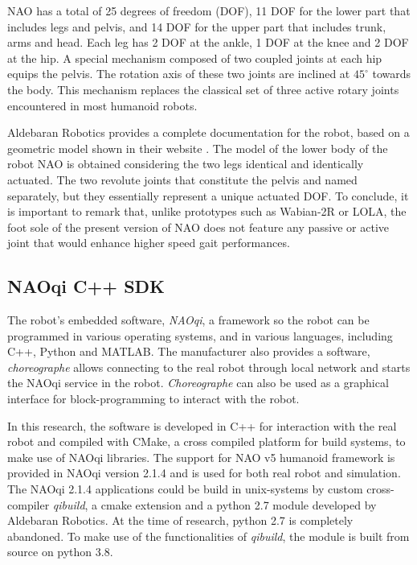 NAO has a total of 25 degrees of freedom (DOF), 11 DOF for the lower part that includes legs and pelvis, and 14 DOF for the upper part that includes trunk, 
arms and head. Each leg has 2 DOF at the ankle, 1 DOF at the knee and 2 DOF at the hip. A special mechanism composed of two coupled joints at each hip equips 
the pelvis. The rotation axis of these two joints are inclined at $45^\circ$ towards the body. This mechanism replaces the classical set of three active rotary joints 
encountered in most humanoid robots.


Aldebaran Robotics provides a complete documentation for the robot, based on a geometric model shown in their website \cite{aldebaran-masses}. The model of the lower body of the robot 
NAO is obtained considering the two legs identical and identically actuated. The two revolute joints that constitute the pelvis and named separately, but 
they essentially represent a unique actuated DOF. To conclude, it is important to remark that, unlike prototypes such as Wabian-2R or LOLA, the foot sole of 
the present version of NAO does not feature any passive or active joint that would enhance higher speed gait performances.


\subsection{NAOqi C++ SDK}

The robot's embedded software, \textit{NAOqi}, a framework so the robot can be programmed in various operating systems, and in various languages, including C++, Python and MATLAB. 
The manufacturer also provides a software, \textit{choreographe} allows connecting to the real robot through local network and starts the NAOqi service in the robot.
\textit{Choreographe} can also be used as a graphical interface for block-programming to interact with the robot.

In this research, the software is developed in C++ for interaction with the real robot and compiled with CMake, a cross compiled platform for build systems, to make use of 
NAOqi libraries. The support for NAO v5 humanoid framework is provided in NAOqi version 2.1.4 and is used for both real robot and simulation. The NAOqi 2.1.4 applications could be build in unix-systems by custom cross-compiler \textit{qibuild}, a cmake extension and a python 2.7 module developed by Aldebaran 
Robotics. At the time of research, python 2.7 is completely abandoned. To make use of the functionalities of \textit{qibuild}, the module is built from source on python 3.8.

